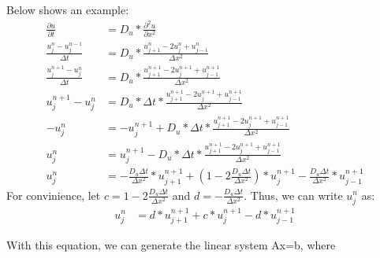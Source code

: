 \documentclass[11pt]{article}
\begin{document}
Below shows an example:
\begin{align*}
    \frac{\partial u}{\partial t} &= D_u * \frac{\partial^{2} u}{\partial x^{2}}\\
    \frac{u^{n}_{j}-u^{n-1}_{j}}{\Delta t} &= D_u * \frac{u^{n}_{j+1}-2u^{n}_{j}+u^{n}_{j-1}}{\Delta x^2}\\
    \frac{u^{n+1}_{j}-u^{n}_{j}}{\Delta t} &= D_u * \frac{u^{n+1}_{j+1}-2u^{n+1}_{j}+u^{n+1}_{j-1}}{\Delta x^2}\\
    u^{n+1}_{j}-u^{n}_{j} &= D_u*\Delta t* \frac{u^{n+1}_{j+1}-2u^{n+1}_{j}+u^{n+1}_{j-1}}{\Delta x^2}\\
    -u^{n}_{j} &= -u^{n+1}_{j} +D_u*\Delta t* \frac{u^{n+1}_{j+1}-2u^{n+1}_{j}+u^{n+1}_{j-1}}{\Delta x^2}\\
    u^{n}_{j} &= u^{n+1}_{j} -D_u*\Delta t* \frac{u^{n+1}_{j+1}-2u^{n+1}_{j}+u^{n+1}_{j-1}}{\Delta x^2}\\
    u^{n}_{j} &= -\frac{D_u\Delta t}{\Delta x^2}*u^{n+1}_{j+1} + (1-2\frac{D_u\Delta t}{\Delta x^2})*u^{n+1}_{j} - \frac{D_u\Delta t}{\Delta x^2}*u^{n+1}_{j-1}
\end{align*}
For convinience, let $c = 1-2\frac{D_u\Delta t}{\Delta x^2}$ and $d=- \frac{D_u\Delta t}{\Delta x^2}$. Thus, we can write $u^{n}_{j}$ as:
\begin{align*}
    u^{n}_{j} &= d*u^{n+1}_{j+1} + c*u^{n+1}_{j} - d*u^{n+1}_{j-1}
\end{align*}

With this equation, we can generate the linear system Ax=b, where
\end{document}
